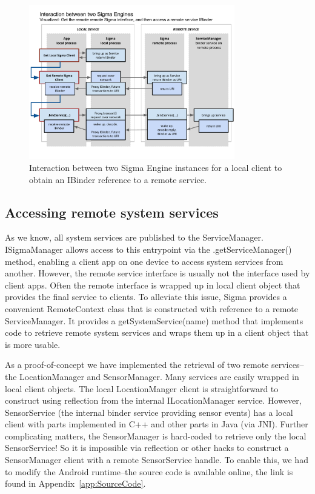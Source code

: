 \documentclass[prodmode]{acmlarge}
\begin{document}
\begin{figure}[h]
\centering
\includegraphics[width=0.8\textwidth]{drawings/SigmaEngineInteraction.pdf}
\caption{Interaction between two Sigma Engine instances for a local client to obtain an IBinder reference to a remote service.}
\label{fig:SigmaInteraction}
\end{figure}

\subsection{Accessing remote system services}
As we know, all system services are published to the ServiceManager. ISigmaManager allows access to this entrypoint via the .getServiceManager() method, enabling a client app on one device to access system services from another. However, the remote service interface is usually not the interface used by client apps. Often the remote interface is wrapped up in local client object that provides the final service to clients. To alleviate this issue, Sigma provides a convenient RemoteContext class that is constructed with reference to a remote ServiceManager. It provides a getSystemService(name) method that implements code to retrieve remote system services and wraps them up in a client object that is more usable.

As a proof-of-concept we have implemented the retrieval of two remote services--the LocationManager and SensorManager. Many services are easily wrapped in local client objects. The local LocationManger client is straightforward to construct using reflection from the internal ILocationManager service. However, SensorService (the internal binder service providing sensor events) has a local client with parts implemented in C++ and other parts in Java (via JNI). Further complicating matters, the SensorManager is hard-coded to retrieve only the local SensorService! So it is impossible via reflection or other hacks to construct a SensorManager client with a remote SensorService handle. To enable this, we had to modify the Android runtime--the source code is available online, the link is found in Appendix~\ref{app:SourceCode}.
\end{document}
